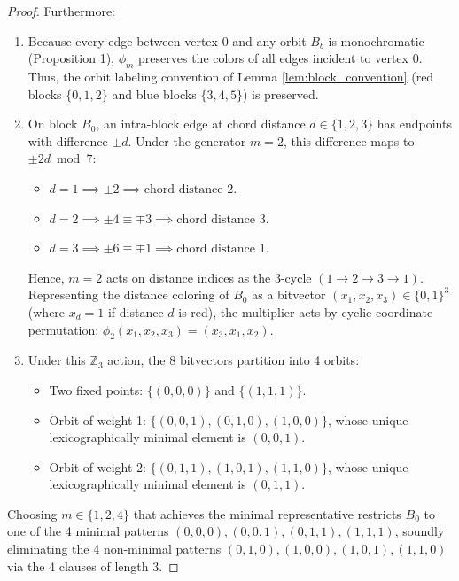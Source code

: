 \documentclass[11pt,a4paper]{article}
\theoremstyle{definition}
\begin{document}
\begin{proof}
Furthermore:
\begin{enumerate}
    \item Because every edge between vertex 0 and any orbit $B_b$ is monochromatic (Proposition 1), $\phi_m$ preserves the colors of all edges incident to vertex 0. Thus, the orbit labeling convention of Lemma \ref{lem:block_convention} (red blocks $\{0,1,2\}$ and blue blocks $\{3,4,5\}$) is preserved.
    \item On block $B_0$, an intra-block edge at chord distance $d \in \{1, 2, 3\}$ has endpoints with difference $\pm d$. Under the generator $m = 2$, this difference maps to $\pm 2d \bmod 7$:
    \begin{itemize}
        \item $d = 1 \implies \pm 2 \implies \text{chord distance } 2$.
        \item $d = 2 \implies \pm 4 \equiv \mp 3 \implies \text{chord distance } 3$.
        \item $d = 3 \implies \pm 6 \equiv \mp 1 \implies \text{chord distance } 1$.
    \end{itemize}
    Hence, $m = 2$ acts on distance indices as the 3-cycle $(1 \to 2 \to 3 \to 1)$. Representing the distance coloring of $B_0$ as a bitvector $(x_1, x_2, x_3) \in \{0, 1\}^3$ (where $x_d = 1$ if distance $d$ is red), the multiplier acts by cyclic coordinate permutation: $\phi_2(x_1, x_2, x_3) = (x_3, x_1, x_2)$.
    \item Under this $\mathbb{Z}_3$ action, the 8 bitvectors partition into 4 orbits:
    \begin{itemize}
        \item Two fixed points: $\{(0,0,0)\}$ and $\{(1,1,1)\}$.
        \item Orbit of weight 1: $\{(0,0,1), (0,1,0), (1,0,0)\}$, whose unique lexicographically minimal element is $(0,0,1)$.
        \item Orbit of weight 2: $\{(0,1,1), (1,0,1), (1,1,0)\}$, whose unique lexicographically minimal element is $(0,1,1)$.
    \end{itemize}
\end{enumerate}
Choosing $m \in \{1, 2, 4\}$ that achieves the minimal representative restricts $B_0$ to one of the 4 minimal patterns $(0,0,0), (0,0,1), (0,1,1), (1,1,1)$, soundly eliminating the 4 non-minimal patterns $(0,1,0), (1,0,0), (1,0,1), (1,1,0)$ via the 4 clauses of length 3.
\end{proof}
\end{document}
